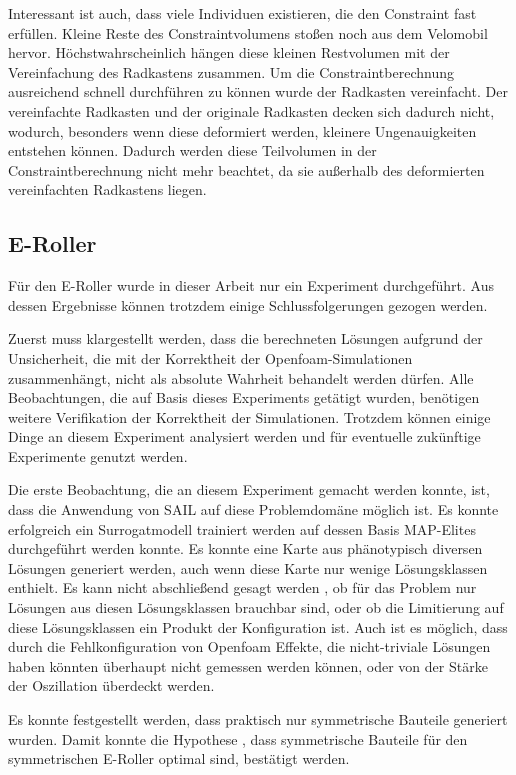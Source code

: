 Interessant ist auch, dass viele Individuen existieren, die den Constraint fast erfüllen.
Kleine Reste des Constraintvolumens stoßen noch aus dem Velomobil hervor.
Höchstwahrscheinlich hängen diese kleinen Restvolumen mit der Vereinfachung des Radkastens zusammen.
Um die Constraintberechnung ausreichend schnell durchführen zu können wurde der Radkasten vereinfacht.
Der vereinfachte Radkasten und der originale Radkasten decken sich dadurch nicht, wodurch, besonders wenn diese deformiert werden, kleinere Ungenauigkeiten entstehen können.
Dadurch werden diese Teilvolumen in der Constraintberechnung nicht mehr beachtet, da sie außerhalb des deformierten vereinfachten Radkastens liegen.



\subsection{E-Roller}

Für den E-Roller wurde in dieser Arbeit nur ein Experiment durchgeführt.
Aus dessen Ergebnisse können trotzdem einige Schlussfolgerungen gezogen werden.

Zuerst muss klargestellt werden, dass  die berechneten Lösungen aufgrund der Unsicherheit, die mit der Korrektheit der Openfoam-Simulationen zusammenhängt, nicht als absolute Wahrheit behandelt werden dürfen.
Alle Beobachtungen, die auf Basis dieses Experiments getätigt wurden, benötigen weitere Verifikation der Korrektheit der Simulationen.
Trotzdem können einige Dinge an diesem Experiment analysiert werden und für eventuelle zukünftige Experimente genutzt werden.

Die erste Beobachtung, die an diesem Experiment gemacht werden konnte, ist, dass die Anwendung von SAIL auf diese Problemdomäne möglich ist.
Es konnte erfolgreich ein Surrogatmodell trainiert werden auf dessen Basis MAP-Elites durchgeführt werden konnte.
Es konnte eine Karte aus phänotypisch diversen Lösungen generiert werden, auch wenn diese Karte nur wenige Lösungsklassen enthielt.
Es kann nicht abschließend gesagt werden , ob für das Problem nur Lösungen aus diesen Lösungsklassen brauchbar sind, oder ob die Limitierung auf diese Lösungsklassen ein Produkt der Konfiguration ist.
Auch ist es möglich, dass durch die Fehlkonfiguration von Openfoam Effekte, die nicht-triviale Lösungen haben könnten überhaupt nicht gemessen werden können, oder von der Stärke der Oszillation überdeckt werden.

Es konnte festgestellt werden, dass praktisch nur symmetrische Bauteile generiert wurden.
Damit konnte die Hypothese , dass symmetrische Bauteile für den symmetrischen E-Roller optimal sind, bestätigt werden.

